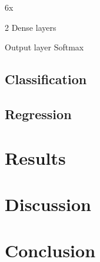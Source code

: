 \documentclass[12pt]{article}
\begin{document}
6x

2 Dense layers

Output layer Softmax

\subsection{Classification}



\subsection{Regression}


\newpage
\section{Results}
\label{sec:results}


\newpage
\section{Discussion}
\label{sec:discussion}


\newpage
\section{Conclusion}
\label{sec:conclusion}



\newpage
\printbibliography

\newpage
\listoffigures
\end{document}
